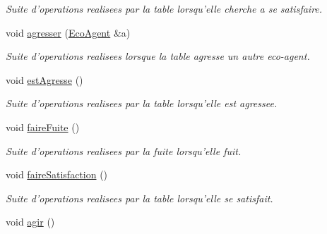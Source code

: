 \begin{CompactItemize}
\begin{CompactList}\small\item\em Suite d'operations realisees par la table lorsqu'elle cherche a se satisfaire. \item\end{CompactList}\item 
void \hyperlink{classTable_e636451a26e8fd61aa9b4c09a92262f7}{agresser} (\hyperlink{classEcoAgent}{EcoAgent} \&a)
\begin{CompactList}\small\item\em Suite d'operations realisees lorsque la table agresse un autre eco-agent. \item\end{CompactList}\item 
\hypertarget{classTable_763c07c018021751ac161382c8469af1}{
void \hyperlink{classTable_763c07c018021751ac161382c8469af1}{estAgresse} ()}
\label{classTable_763c07c018021751ac161382c8469af1}

\begin{CompactList}\small\item\em Suite d'operations realisees par la table lorsqu'elle est agressee. \item\end{CompactList}\item 
\hypertarget{classTable_cefc0a468fbffa2273c0fbaf73589177}{
void \hyperlink{classTable_cefc0a468fbffa2273c0fbaf73589177}{faireFuite} ()}
\label{classTable_cefc0a468fbffa2273c0fbaf73589177}

\begin{CompactList}\small\item\em Suite d'operations realisees par la fuite lorsqu'elle fuit. \item\end{CompactList}\item 
\hypertarget{classTable_b442e96905d4a14e2eb1151eb6de5481}{
void \hyperlink{classTable_b442e96905d4a14e2eb1151eb6de5481}{faireSatisfaction} ()}
\label{classTable_b442e96905d4a14e2eb1151eb6de5481}

\begin{CompactList}\small\item\em Suite d'operations realisees par la table lorsqu'elle se satisfait. \item\end{CompactList}\item 
\hypertarget{classTable_314f12a86dbd1c133df83f33e2d92bec}{
void \hyperlink{classTable_314f12a86dbd1c133df83f33e2d92bec}{agir} ()}
\label{classTable_314f12a86dbd1c133df83f33e2d92bec}


\end{CompactItemize}
